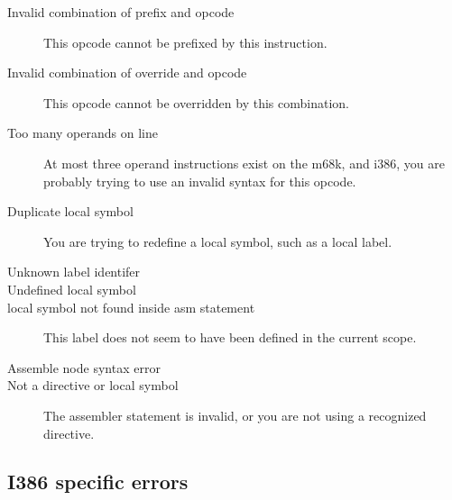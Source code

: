 \begin{description}
\item [Invalid combination of prefix and opcode]
This opcode cannot be prefixed by this instruction.

\item [Invalid combination of override and opcode]
This opcode cannot be overridden by this combination.

\item [Too many operands on line]
At most three operand instructions exist on the m68k, and i386, you
are probably trying to use an invalid syntax for this opcode.

\item [Duplicate local symbol]
You are trying to redefine a local symbol, such as a local label.

\item [Unknown label identifer]
\item [Undefined local symbol]
\item [local symbol not found inside asm statement]
This label does not seem to have been defined in the current scope.


\item [Assemble node syntax error]
\item [Not a directive or local symbol]
The assembler statement is invalid, or you are not using a recognized
directive.

\end{description}

\subsection{I386 specific errors}

